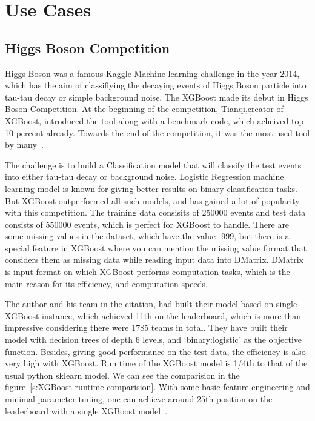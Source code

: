 \section{Use Cases}

\subsection{Higgs Boson Competition}

Higgs Boson was a famous Kaggle Machine learning challenge in the year 2014,
which has the  aim of classifiying the decaying events of Higgs Boson particle
into tau-tau decay or simple  background noise. The XGBoost made its debut in
Higgs Boson Competition. At the beginning of  the competition, Tianqi,creator
of XGBoost, introduced the tool along with a benchmark code,  which acheived
top 10 percent already. Towards the end of the competition, it was the most
used tool by many~\cite{hid-sp18-401-Kaggle-Higgs-Boson}. 

The challenge is to build a Classification model that will classify the test
events into either tau-tau decay or background noise. Logistic Regression
machine learning model is known for giving better results on binary
classification tasks. But XGBoost outperformed all such models, and has gained
a lot of popularity with this competition. The training data consisits of
250000 events and test data consists of 550000 events, which is perfect for
XGBoost to handle. There are some missing values in the dataset, which  have
the value -999, but there is a special feature in XGBoost where you can
mention the missing value format that considers them as missing data while
reading input data into DMatrix. DMatrix is input format on which XGBoost
performs computation tasks, which is the main reason for its efficiency, and
computation speeds.

The author and his team in the citation, had built their model based on single
XGBoost instance, which achieved 11th on the leaderboard, which is more than
impressive considering there were 1785 teams in total. They have built their
model with decision trees of depth 6 levels, and `binary:logistic' as the
objective function. Besides, giving good performance on the test data, the
efficiency is also very high with XGBoost. Run time of the XGBoost model is
1/4th to that of the usual python sklearn model. We can see the comparision in
the figure~\ref{s:XGBoost-runtime-comparision}. With some basic feature
engineering and minimal parameter tuning, one can achieve around 25th position
on the leaderboard with a single XGBoost model~\cite{hid-sp18-401-XGBoost-pdf}.



